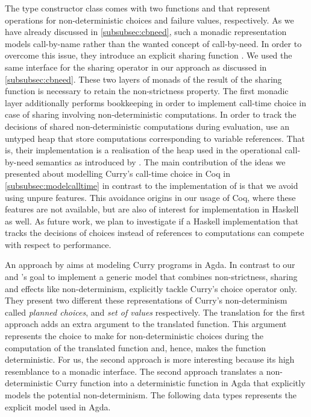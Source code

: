 The type constructor class  comes with two functions
 and  that represent operations for
non-deterministic choices and failure values, respectively.
As we have already discussed in \autoref{subsubsec:cbneed}, such a
monadic representation models call-by-name rather than the wanted
concept of call-by-need.
In order to overcome this issue, they introduce an explicit sharing
function .
We used the same interface for the sharing operator in our approach as
discussed in \autoref{subsubsec:cbneed}.
These two layers of monads of the result of the sharing function is
necessary to retain the non-strictness property.
The first monadic layer additionally performs bookkeeping in order to
implement call-time choice in case of sharing involving
non-deterministic computations.
In order to track the decisions of shared non-deterministic
computations during evaluation, \citeauthor{fischer2009purely} use
an untyped heap that store computations corresponding to variable
references.
That is, their implementation is a realisation of the heap used in the
operational call-by-need semantics as introduced by
\citet{launchbury1993natural}.
The main contribution of the ideas we presented about modelling
Curry's call-time choice in Coq in \autoref{subsubsec:modelcalltime}
in contrast to the implementation of \citeauthor{fischer2009purely} is
that we avoid using unpure features.
This avoidance origins in our usage of Coq, where these features are
not available, but are also of interest for implementation in Haskell
as well.
As future work, we plan to investigate if a Haskell implementation
that tracks the decisions of choices instead of references to
computations can compete with respect to performance.

An approach by \citet{antoy2017proving} aims at modeling Curry
programs in Agda.
In contrast to our and \citeauthor{fischer2009purely}'s goal to
implement a generic model that combines non-strictness, sharing and
effects like non-determinism, \citeauthor{antoy2017proving} explicitly
tackle Curry's choice operator only.
They present two different these representations of Curry's
non-determinism called \emph{planned choices}, and \emph{set of values}
respectively.
The translation for the first approach adds an extra argument to the
translated function.
This argument represents the choice to make for non-deterministic
choices during the computation of the translated function and, hence,
makes the function deterministic.
For us, the second approach is more interesting because its high
resemblance to a monadic interface.
The second approach translates a non-deterministic Curry function into
a deterministic function in Agda that explicitly models the potential
non-determinism.
The following data types represents the explicit model used in Agda.

